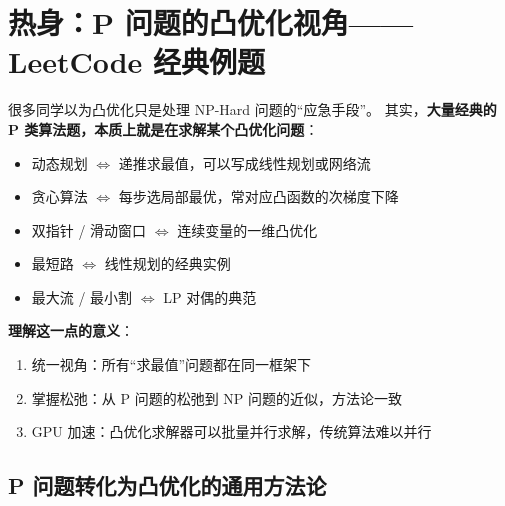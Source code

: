 \documentclass[12pt, a4paper]{ctexart}
\begin{document}
\section{热身：P 问题的凸优化视角——LeetCode 经典例题}

\begin{blackboard}[为什么先看 P 问题？]

很多同学以为凸优化只是处理 NP-Hard 问题的``应急手段''。
其实，\textbf{大量经典的 P 类算法题，本质上就是在求解某个凸优化问题}：

\begin{itemize}
    \item 动态规划 $\Leftrightarrow$ 递推求最值，可以写成线性规划或网络流
    \item 贪心算法 $\Leftrightarrow$ 每步选局部最优，常对应凸函数的次梯度下降
    \item 双指针 / 滑动窗口 $\Leftrightarrow$ 连续变量的一维凸优化
    \item 最短路 $\Leftrightarrow$ 线性规划的经典实例
    \item 最大流 / 最小割 $\Leftrightarrow$ LP 对偶的典范
\end{itemize}

\textbf{理解这一点的意义}：
\begin{enumerate}
    \item 统一视角：所有``求最值''问题都在同一框架下
    \item 掌握松弛：从 P 问题的松弛到 NP 问题的近似，方法论一致
    \item GPU 加速：凸优化求解器可以批量并行求解，传统算法难以并行
\end{enumerate}

\end{blackboard}

\subsection{P 问题转化为凸优化的通用方法论}
\end{document}
